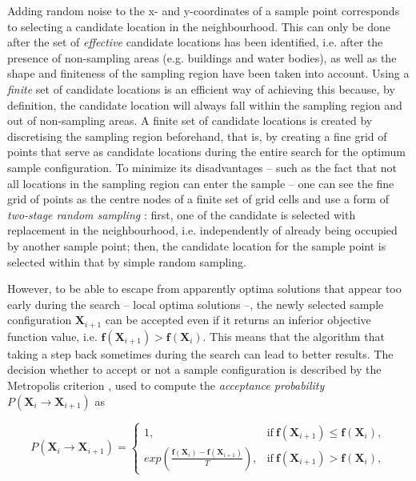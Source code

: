 Adding random noise to the x- and y-coordinates of a sample point corresponds to selecting a candidate location 
in the neighbourhood. This can only be done after the set of \emph{effective} candidate locations has been 
identified, i.e. after the presence of non-sampling areas (e.g. buildings and water bodies), as well as the 
shape and finiteness of the sampling region have been taken into account. Using a \emph{finite} set of 
candidate locations is an efficient way of achieving this because, by definition, the candidate location will 
always fall within the sampling region and out of non-sampling areas. A finite set of candidate locations is 
created by discretising the sampling region beforehand, that is, by creating a fine grid of points that serve 
as candidate locations during the entire search for the optimum sample configuration. To minimize its 
disadvantages -- such as the fact that not all locations in the sampling region can enter the sample -- one can 
see the fine grid of points as the centre nodes of a finite set of grid cells and use a form of \emph{two-stage 
random sampling} \cite{WalvoortEtAl2010}: first, one of the candidate  is selected with 
replacement in the neighbourhood, i.e. independently of already being occupied by another sample point; then, 
the candidate location for the sample point is selected within that  by simple random sampling.

However, to be able to escape from apparently optima solutions that appear too early during the search -- 
local optima solutions --, the newly selected sample configuration $\boldsymbol{X}_{i + 1}$ can be 
accepted even if it returns an inferior objective function value, i.e. $\boldsymbol{f}(\boldsymbol{X}_{i + 1}) 
>  \boldsymbol{f}(\boldsymbol{X}_i)$. This means that the algorithm  that taking a step back 
sometimes during the search can lead to better results. The decision whether to accept or not a sample 
configuration is described by the Metropolis criterion \cite{MetropolisEtAl1953}, used to compute the 
\emph{acceptance probability} $P(\boldsymbol{X}_i \rightarrow \boldsymbol{X}_{i + 1})$ as

\begin{equation}\label{eqn:chap08-metropolis} %
 P(\boldsymbol{X}_i \rightarrow \boldsymbol{X}_{i + 1}) = 
 \begin{cases}
  1, & \text{if}\  \boldsymbol{f}(\boldsymbol{X}_{i + 1}) \leq  \boldsymbol{f}(\boldsymbol{X}_i), \\ 
  exp\left(\frac{\boldsymbol{f}(\boldsymbol{X}_i) -  \boldsymbol{f}(\boldsymbol{X}_{i + 1})}{T}\right),  
      & \text{if}\  \boldsymbol{f}(\boldsymbol{X}_{i + 1}) >  \boldsymbol{f}(\boldsymbol{X}_i ),
 \end{cases}
\end{equation}


